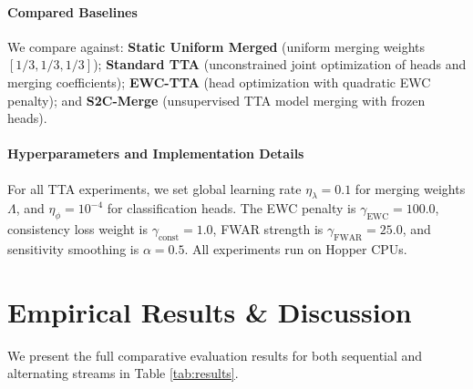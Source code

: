 \documentclass{article}
\begin{document}
\paragraph{Compared Baselines}
We compare against: \textbf{Static Uniform Merged} (uniform merging weights $[1/3, 1/3, 1/3]$); \textbf{Standard TTA} (unconstrained joint optimization of heads and merging coefficients); \textbf{EWC-TTA} \cite{daheim2023elastic} (head optimization with quadratic EWC penalty); and \textbf{S2C-Merge} \cite{li2024collaborative} (unsupervised TTA model merging with frozen heads).

\paragraph{Hyperparameters and Implementation Details}
For all TTA experiments, we set global learning rate $\eta_{\lambda} = 0.1$ for merging weights $\Lambda$, and $\eta_{\phi} = 10^{-4}$ for classification heads. The EWC penalty is $\gamma_{\text{EWC}} = 100.0$, consistency loss weight is $\gamma_{\text{const}} = 1.0$, FWAR strength is $\gamma_{\text{FWAR}} = 25.0$, and sensitivity smoothing is $\alpha = 0.5$. All experiments run on Hopper CPUs.

\section{Empirical Results \& Discussion}
\label{sec:results}

We present the full comparative evaluation results for both sequential and alternating streams in Table \ref{tab:results}.
\end{document}
